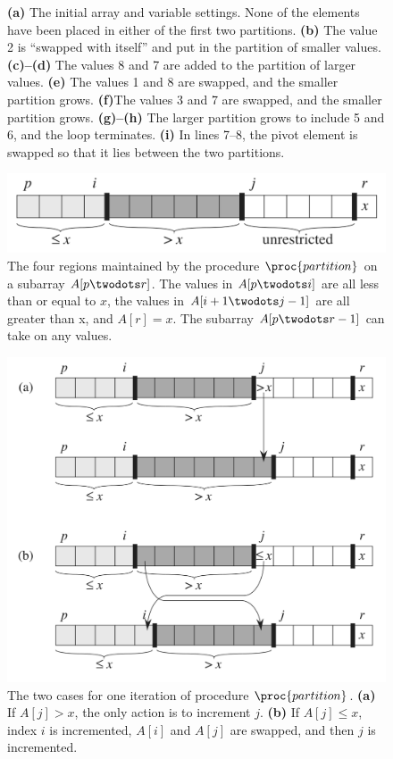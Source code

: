 \documentclass{article}
\begin{document}
\begin{figure}[!ht]
{    \textbf{(a)} The initial array and variable settings. None of the elements have been placed in either of the first two partitions.
    \textbf{(b)} The value 2 is “swapped with itself” and put in the partition of smaller values. 
    \textbf{(c)–(d)} The values 8 and 7 are added to the partition of larger values. 
    \textbf{(e)} The values 1 and 8 are swapped, and the smaller partition grows. 
    \textbf{(f)}The values 3 and 7 are swapped, and the smaller partition grows. 
    \textbf{(g)–(h)} The larger partition grows to include 5 and 6, and the loop terminates. 
    \textbf{(i)} In lines 7–8, the pivot element is swapped so that it lies between the two partitions.
}
\label{fig:quicksort1}
\end{figure}

\clearpage

\begin{figure}[!ht]
\includegraphics[scale=0.25]{partitions}
\caption{
    The four regions maintained by the procedure $\proc{partition}$ on a subarray $A[p \twodots r]$. The values in $A[p \twodots i]$ are all less than or equal to $x$, the values in $A[i+1 \twodots j-1]$ are all greater than x, and $A[r] = x$. The subarray $A[p \twodots r-1]$ can take on any values.
}
\label{fig:quicksort2}
\end{figure}

\begin{figure}[!ht]
\includegraphics[scale=0.45]{partition_cases}
\caption{
    The two cases for one iteration of procedure $\proc{partition}$. 
    \textbf{(a)} If $A[j] > x$, the only action is to increment $j$.
    \textbf{(b)} If $A[j] \leq x$, index $i$ is incremented, $A[i]$ and $A[j]$ are swapped, and then $j$ is incremented.
}
\label{fig:quicksort3}
\end{figure}
\end{document}
